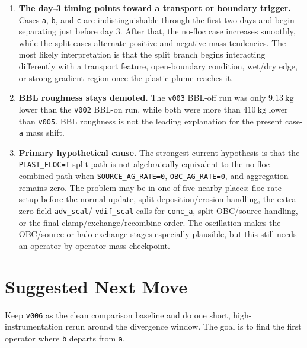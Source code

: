 \documentclass[11pt]{article}
\begin{document}
\begin{enumerate}
\item \textbf{The day-3 timing points toward a transport or boundary trigger.}
Cases \texttt{a}, \texttt{b}, and \texttt{c} are indistinguishable through the
first two days and begin separating just before day 3.  After that, the no-floc
case increases smoothly, while the split cases alternate positive and negative
mass tendencies.  The most likely interpretation is that the split branch begins
interacting differently with a transport feature, open-boundary condition,
wet/dry edge, or strong-gradient region once the plastic plume reaches it.

\item \textbf{BBL roughness stays demoted.} The \texttt{v003} BBL-off run was
only \(9.13~\mathrm{kg}\) lower than the \texttt{v002} BBL-on run, while both
were more than \(410~\mathrm{kg}\) lower than \texttt{v005}.  BBL roughness is
not the leading explanation for the present case-\texttt{a} mass shift.

\item \textbf{Primary hypothetical cause.} The strongest current hypothesis is
that the \texttt{PLAST\_FLOC=T} split path is not algebraically equivalent to
the no-floc combined path when \texttt{SOURCE\_AG\_RATE=0},
\texttt{OBC\_AG\_RATE=0}, and aggregation remains zero.  The problem may be in
one of five nearby places: floc-rate setup before the normal update, split
deposition/erosion handling, the extra zero-field \texttt{adv\_scal}/
\texttt{vdif\_scal} calls for \texttt{conc\_a}, split OBC/source handling, or
the final clamp/exchange/recombine order.  The oscillation makes the OBC/source
or halo-exchange stages especially plausible, but this still needs an
operator-by-operator mass checkpoint.
\end{enumerate}

\section*{Suggested Next Move}
Keep \texttt{v006} as the clean comparison baseline and do one short,
high-instrumentation rerun around the divergence window.  The goal is to find
the first operator where \texttt{b} departs from \texttt{a}.
\end{document}

